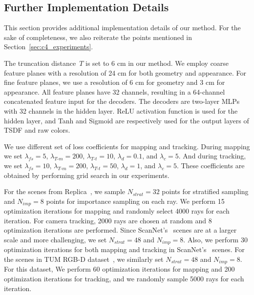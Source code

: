 \subsection{Further Implementation Details} \label{sec:c4_supp_details}
This section provides additional implementation details of our method. For the sake of completeness, we also reiterate the points mentioned in Section~\ref{sec:c4_experiments}.

The truncation distance~$T$ is set to 6 cm in our method. We employ coarse feature planes with a resolution of 24 cm for both geometry and appearance. For fine feature planes, we use a resolution of 6 cm for geometry and 3 cm for appearance. All feature planes have 32 channels, resulting in a 64-channel concatenated feature input for the decoders. The decoders are two-layer MLPs with 32 channels in the hidden layer. ReLU activation function is used for the hidden layer, and Tanh and Sigmoid are respectively used for the output layers of TSDF and raw colors.

We use different set of loss coefficients for mapping and tracking. During mapping we set $\lambda_{fs}=5$, $\lambda_{T\text{-}m}=200$, $\lambda_{T\text{-}t}=10$, $\lambda_{d}=0.1$, and $\lambda_{c}=5$. And during tracking, we set $\lambda_{fs}=10$, $\lambda_{T\text{-}m}=200$, $\lambda_{T\text{-}t}=50$, $\lambda_{d}=1$, and $\lambda_{c}=5$. These coefficients are obtained by performing grid search in our experiments.

For the scenes from Replica~\citep{replica19arxiv}, we sample $N_{strat}=32$ points for stratified sampling and $N_{imp}=8$ points for importance sampling on each ray. We perform 15 optimization iterations for mapping and randomly select 4000 rays for each iteration. For camera tracking, 2000 rays are chosen at random and 8 optimization iterations are performed. Since ScanNet's~\citep{dai2017scannet} scenes are at a larger scale and more challenging, we set $N_{strat}=48$ and $N_{imp}=8$. Also, we perform 30 optimization iterations for both mapping and tracking in ScanNet's~\citep{dai2017scannet} scenes. For the scenes in TUM RGB-D dataset~\citep{sturm2012benchmark}, we similarly set $N_{strat}=48$ and $N_{imp}=8$. For this dataset, We perform 60 optimization iterations for mapping and 200 optimization iterations for tracking, and we randomly sample 5000 rays for each iteration.

